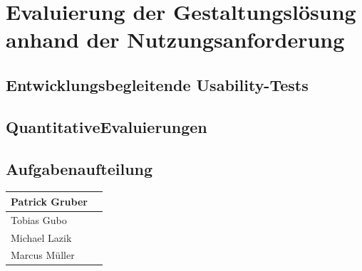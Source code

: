 \documentclass[12pt, a4paper]{scrartcl}
\begin{document}
	\newpage
	
	\section{Evaluierung der Gestaltungslösung anhand der Nutzungsanforderung}
	\blindtext[2]
	\subsection{Entwicklungsbegleitende Usability-Tests}
	\blindtext[1]
	\subsection{QuantitativeEvaluierungen}
	
	
	\subsection*{Aufgabenaufteilung}
	\begin{tabularx}{0.95\textwidth}{|l|X|}
		\hline
		Patrick Gruber & \\
		\hline
		Tobias Gubo & \\
		\hline
		Michael Lazik & \\
		\hline
		Marcus Müller & \\
		\hline
	\end{tabularx}
	
	
	
\end{document}
